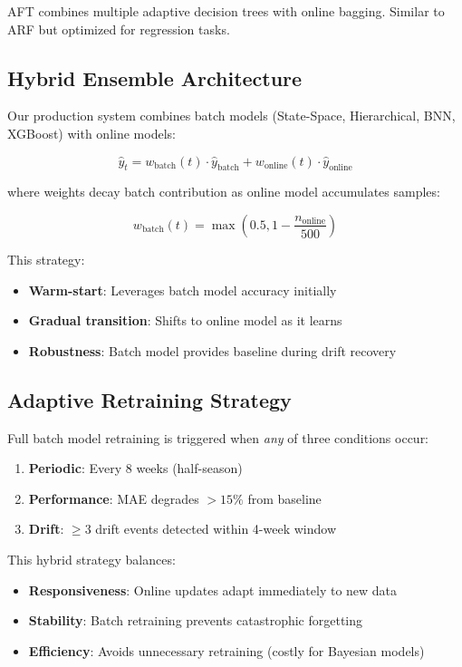 AFT combines multiple adaptive decision trees with online bagging. Similar to ARF but optimized for regression tasks.

\subsection{Hybrid Ensemble Architecture}

Our production system combines batch models (State-Space, Hierarchical, BNN, XGBoost) with online models:

\begin{equation}
\hat{y}_t = w_{\text{batch}}(t) \cdot \hat{y}_{\text{batch}} + w_{\text{online}}(t) \cdot \hat{y}_{\text{online}}
\end{equation}

where weights decay batch contribution as online model accumulates samples:

\begin{equation}
w_{\text{batch}}(t) = \max\left(0.5, 1 - \frac{n_{\text{online}}}{500}\right)
\end{equation}

This strategy:
\begin{itemize}
    \item \textbf{Warm-start}: Leverages batch model accuracy initially
    \item \textbf{Gradual transition}: Shifts to online model as it learns
    \item \textbf{Robustness}: Batch model provides baseline during drift recovery
\end{itemize}

\subsection{Adaptive Retraining Strategy}

Full batch model retraining is triggered when \textit{any} of three conditions occur:

\begin{enumerate}
    \item \textbf{Periodic}: Every 8 weeks (half-season)
    \item \textbf{Performance}: MAE degrades $>15\%$ from baseline
    \item \textbf{Drift}: $\geq 3$ drift events detected within 4-week window
\end{enumerate}

This hybrid strategy balances:
\begin{itemize}
    \item \textbf{Responsiveness}: Online updates adapt immediately to new data
    \item \textbf{Stability}: Batch retraining prevents catastrophic forgetting
    \item \textbf{Efficiency}: Avoids unnecessary retraining (costly for Bayesian models)
\end{itemize}

